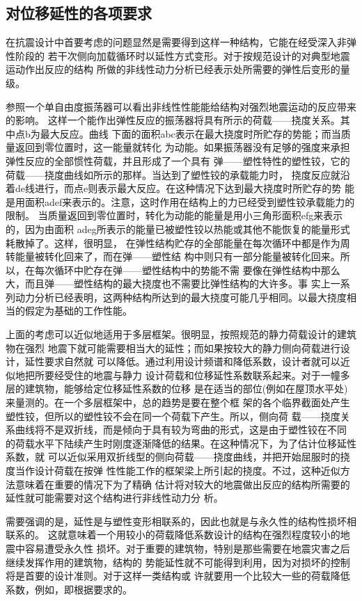 \documentclass[12pt,a4paper]{book}
\begin{document}
\subsection{对位移延性的各项要求}

在抗震设计中首要考虑的问题显然是需要得到这样一种结构，它能在经受深入非弹性阶段的
若干次侧向加载循环时以延性方式变形。对于按规范设计的对典型地震运动作出反应的结构
所做的非线性动力分析已经表示处所需要的弹性后变形的量级。

参照一个单自由度振荡器可以看出非线性性能能给结构对强烈地震运动的反应带来的影响。
这样一个能作出弹性反应的振荡器将具有所示的荷载——挠度关系。其中点b为最大反应。曲线
下面的面积abc表示在最大挠度时所贮存的势能；而当质量返回到零位置时，这一能量就转化
为动能。如果振荡器没有足够的强度来承担弹性反应的全部惯性荷载，并且形成了一个具有
弹——塑性特性的塑性铰，它的荷载——挠度曲线如所示的那样。当达到了塑性铰的承载能力时，
挠度反应就沿着de线进行，而点e则表示最大反应。在这种情况下达到最大挠度时所贮存的势
能是用面积adef来表示的。注意，这时作用在结构上的力已经受到塑性铰承载能力的限制。
当质量返回到零位置时，转化为动能的能量是用小三角形面积efg来表示的，因为由面积
adeg所表示的能量已被塑性铰以热能或其他不能恢复的能量形式耗散掉了。这样，很明显，
在弹性结构贮存的全部能量在每次循环中都是作为周转能量被转化回来了，而在弹——塑性结
构中则只有一部分能量被转化回来。所以，在每次循环中贮存在弹——塑性结构中的势能不需
要像在弹性结构中那么大，而且弹——塑性结构的最大挠度也不需要比弹性结构的大许多。事
实上一系列动力分析已经表明，这两种结构所达到的最大挠度可能几乎相同。以最大挠度相
当的假定为基础的工作性能。

上面的考虑可以近似地适用于多层框架。很明显，按照规范的静力荷载设计的建筑物在强烈
地震下就可能需要相当大的延性；而如果按较大的静力侧向荷载进行设计，延性要求自然就
可以降低。通过利用设计频谱和降低系数，设计者就可以近似地把所要经受住的地震与静力
设计荷载和位移延性系数联系起来。对于一幢多层的建筑物，能够给定位移延性系数的位移
是在适当的部位(例如在屋顶水平处)来量测的。在一个多层框架中，总的趋势是要在整个框
架的各个临界截面处产生塑性铰，但所以的塑性铰不会在同一个荷载下产生。所以，侧向荷
载——挠度关系曲线将不是双折线，而是倾向于具有较为弯曲的形式，这是由于塑性铰在不同
的荷载水平下陆续产生时刚度逐渐降低的结果。在这种情况下，为了估计位移延性系数，就
可以近似采用双折线型的侧向荷载——挠度曲线，并把开始屈服时的挠度当作设计荷载在按弹
性性能工作的框架梁上所引起的挠度。不过，这种近似方法意味着在重要的情况下为了精确
估计将对较大的地震做出反应的结构所需要的延性就可能需要对这个结构进行非线性动力分
析。

需要强调的是，延性是与塑性变形相联系的，因此也就是与永久性的结构性损坏相联系的。
这就意味着一个用较小的荷载降低系数设计的结构在强烈程度较小的地震中容易遭受永久性
损坏。对于重要的建筑物，特别是那些需要在地震灾害之后继续发挥作用的建筑物，结构的
势能延性就不可能得到利用，因为对损坏的控制将是首要的设计准则。对于这样一类结构或
许就要用一个比较大一些的荷载降低系数，例如，即根据要求的。
\end{document}
